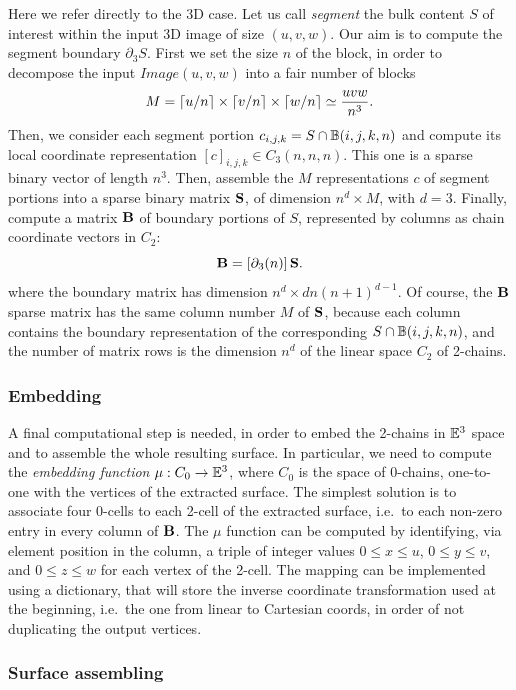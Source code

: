 Here we refer directly to the 3D case.
Let us call \emph{segment} the bulk content $S$ of interest within the input 3D image of size $(u,v,w)$. Our aim is to compute the segment boundary $\partial_3 S$. 
First we set the size $n$ of the block, in order to decompose the input $Image(u,v,w)$ into a fair number of blocks
\[
M = \left\lceil u/n \right\rceil \times \left\lceil v/n \right\rceil \times \left\lceil w/n \right\rceil \simeq \frac{uvw}{n^3}.
\] 
Then, we consider each segment portion $c_{i,j,k} = S\cap \mathbb{B}(i,j,k,n)$ and compute its local coordinate representation  $[c]_{i,j,k}\in C_3(n,n,n)$. This one is a sparse binary vector of length $n^3$. Then, assemble the $M$ representations $c$ of segment portions into a sparse binary matrix ${\bf S}$, of dimension $n^d \times M$, with $d=3$. Finally, compute a matrix ${\bf \textbf{B}}$ of boundary portions of $S$, represented by columns as chain coordinate vectors in $C_2$:
\[
{\bf \textbf{B}} = [\partial_3(n)]\, {\bf S}.
\]
where the boundary matrix has dimension $n^d \times dn(n+1)^{d-1}$.
Of course, the ${\bf \textbf{B}}$ sparse matrix has the same column number $M$ of ${\bf S}$, because each column contains the boundary representation of the corresponding $S \cap \mathbb{B}(i,j,k,n)$, and the number of matrix rows is the dimension $n^d$ of the linear space $C_2$ of 2-chains.

\subsubsection*{Embedding}
A final computational step is needed, in order to embed the 2-chains in $\mathbb{E}^3$ space and to assemble the whole resulting surface. In particular, we need to compute the \emph{embedding function} $\mu : C_0 \to \mathbb{E}^3$, where $C_0$ is the space of 0-chains, one-to-one with the vertices of the extracted surface. The simplest solution is to associate  four 0-cells to each 2-cell of the extracted surface, i.e.~to each non-zero entry in every column of ${\bf \textbf{B}}$.  The $\mu$ function  can be computed by identifying, via  element position in the column, a triple of integer values $0\leq x\leq u$, $0\leq y\leq v$, and $0\leq z\leq w$ for each vertex of the 2-cell.  The mapping can be implemented using a dictionary, that will store the inverse coordinate transformation used at the beginning, i.e.~the one from linear to Cartesian coords, in order of not duplicating the output vertices.   

\subsubsection*{Surface assembling}

